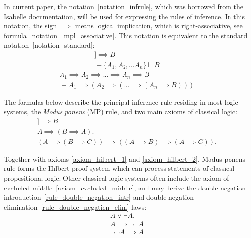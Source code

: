 \documentclass[article]{aaltoseries}
\begin{document}
In current paper, the notation~\eqref{notation_infrule}, which was borrowed from the Isabelle documentation, will be used for expressing the rules of inference. In this notation, the sign $\implies$ means logical implication, which is right-associative, see formula~\eqref{notation_impl_associative}. This notation is equivalent to the standard notation~\eqref{notation_standard}:
\begin{gather}
[\![ A_{1}; A_{2}; \dots A_{n} ]\!] \implies B 
    \label{notation_infrule}\\
\equiv \{ A_{1}, A_{2}, \dots A_{n} \} \vdash B
    \label{notation_standard}
\end{gather}
\begin{equation}\label{notation_impl_associative}
\begin{aligned}
A_{1} \implies A_{2} \implies \dots \implies A_{n} \implies B \\
\equiv  A_{1} \implies ( A_{2} \implies ( \dots \implies ( A_{n} \implies B)))
\end{aligned}
\end{equation}


The formulas below describe the principal inference rule residing in most logic systems, the \textit{Modus ponens} (MP) rule, and two main axioms of classical logic:
\begin{gather}
[\![ A, A \implies B ]\!] \implies B
    \label{rule_modus_ponens}\tag{MP} \\
%
A \implies (B \implies A).
	\label{axiom_hilbert_1}\tag{A1} \\
%
(A \implies (B \implies C)) \implies ((A \implies B) \implies (A \implies C)).
	\label{axiom_hilbert_2}\tag{A2}
\end{gather}

Together with axioms \eqref{axiom_hilbert_1} and \eqref{axiom_hilbert_2}, Modus ponens rule forms the Hilbert proof system which can process statements of classical propositional logic.
Other classical logic systems often include the axiom of excluded middle~\eqref{axiom_excluded_middle}, and may derive the double negation introduction~\eqref{rule_double_negation_intr} and double negation elimination~\eqref{rule_double_negation_elim} laws:
\begin{gather}
A \lor \neg A.
	\label{axiom_excluded_middle}\tag{EM} \\
%
A \implies \neg \neg A
\label{rule_double_negation_intr}\tag{DNi} \\
%
\neg \neg A \implies A
\label{rule_double_negation_elim}\tag{DNe}
\end{gather}
\end{document}
